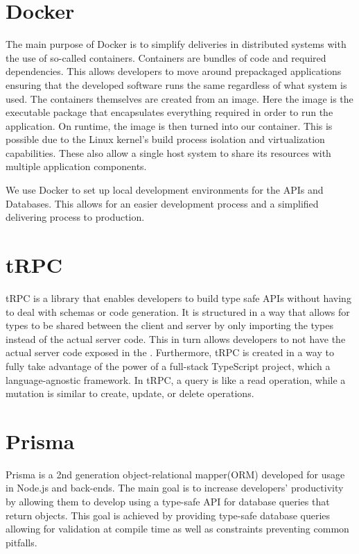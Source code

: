 \section*{Docker}
The main purpose of Docker is to simplify deliveries in distributed systems with the use of so-called containers\cite{Docker_Container}.
Containers are bundles of code and required dependencies. This allows developers to move around prepackaged applications ensuring that the developed software runs the same regardless of what system is used\cite{Docker_Container}.
The containers themselves are created from an image. Here the image is the executable package that encapsulates everything required in order to run the application. On runtime, the image is then turned into our container. 
This is possible due to the Linux kernel's build process isolation and virtualization capabilities. These also allow a single host system to share its resources with multiple application components\cite{Docker_Container}.

We use Docker to set up local development environments for the APIs and Databases. This allows for an easier development process and a simplified delivering process to production.

\section*{tRPC}
tRPC is a library that enables developers to build type safe APIs without having to deal with schemas or code generation. 
It is structured in a way that allows for types to be shared between the client and server by only importing the types instead of the actual server code. 
This in turn allows developers to not have the actual server code exposed in the \frontend{}. 
Furthermore, tRPC is created in a way to fully take advantage of the power of a full-stack TypeScript project, which a language-agnostic framework\cite{tRPC}.
In tRPC, a query is like a read operation, while a mutation is similar to create, update, or delete operations.

\section*{Prisma}
Prisma is a 2nd generation object-relational mapper(ORM) developed for usage in Node.js and \typescript{} back-ends. 
The main goal is to increase developers' productivity by allowing them to develop using a type-safe API for database queries that return \javascript{} objects. 
This goal is achieved by providing type-safe database queries allowing for validation at compile time as well as constraints preventing common pitfalls\cite{Prisma_Why}.

